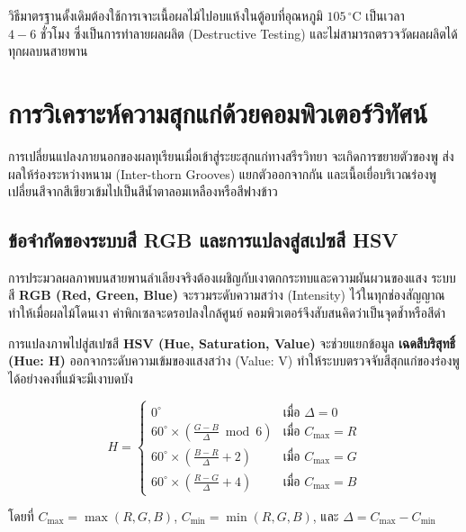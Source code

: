 วิธีมาตรฐานดั้งเดิมต้องใช้การเจาะเนื้อผลไม้ไปอบแห้งในตู้อบที่อุณหภูมิ $105\,^\circ\text{C}$ เป็นเวลา $4 - 6\text{ ชั่วโมง}$ ซึ่งเป็นการทำลายผลผลิต (Destructive Testing) และไม่สามารถตรวจวัดผลผลิตได้ทุกผลบนสายพาน

\section{การวิเคราะห์ความสุกแก่ด้วยคอมพิวเตอร์วิทัศน์}

การเปลี่ยนแปลงภายนอกของผลทุเรียนเมื่อเข้าสู่ระยะสุกแก่ทางสรีรวิทยา จะเกิดการขยายตัวของพู ส่งผลให้ร่องระหว่างหนาม (Inter-thorn Grooves) แยกตัวออกจากกัน และเนื้อเยื่อบริเวณร่องพูเปลี่ยนสีจากสีเขียวเข้มไปเป็นสีน้ำตาลอมเหลืองหรือสีฟางข้าว

\subsection{ข้อจำกัดของระบบสี RGB และการแปลงสู่สเปซสี HSV}

การประมวลผลภาพบนสายพานลำเลียงจริงต้องเผชิญกับเงาตกกระทบและความผันผวนของแสง ระบบสี \textbf{RGB (Red, Green, Blue)} จะรวมระดับความสว่าง (Intensity) ไว้ในทุกช่องสัญญาณ ทำให้เมื่อผลไม้โดนเงา ค่าพิกเซลจะดรอปลงใกล้ศูนย์ คอมพิวเตอร์จึงสับสนคิดว่าเป็นจุดช้ำหรือสีดำ

การแปลงภาพไปสู่สเปซสี \textbf{HSV (Hue, Saturation, Value)} จะช่วยแยกข้อมูล \textbf{เฉดสีบริสุทธิ์ (Hue: H)} ออกจากระดับความเข้มของแสงสว่าง (Value: V) ทำให้ระบบตรวจจับสีสุกแก่ของร่องพูได้อย่างคงที่แม้จะมีเงาบดบัง

\begin{equation}
H = \begin{cases}
0^\circ & \text{เมื่อ } \Delta = 0 \\
60^\circ \times \left( \frac{G - B}{\Delta} \bmod 6 \right) & \text{เมื่อ } C_{\max} = R \\
60^\circ \times \left( \frac{B - R}{\Delta} + 2 \right) & \text{เมื่อ } C_{\max} = G \\
60^\circ \times \left( \frac{R - G}{\Delta} + 4 \right) & \text{เมื่อ } C_{\max} = B
\end{cases}
\label{eq:rgb_to_hsv}
\end{equation}

โดยที่ $C_{\max} = \max(R, G, B)$, $C_{\min} = \min(R, G, B)$, และ $\Delta = C_{\max} - C_{\min}$

